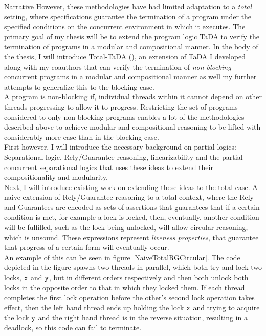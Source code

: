 \documentclass{article}
\begin{document}
\begin{section}{Narrative}
  However, these methodologies have had limited adaptation to a \emph{total} setting, where specifications guarantee the termination of a program under the specified conditions on the concurrent environment in which it executes. The primary goal of my thesis will be to extend the program logic TaDA to verify the termination of programs in a modular and compositional manner. In the body of the thesis, I will introduce Total-TaDA (\cite{Total-TaDA}), an extension of TaDA I developed along with my coauthors that can verify the termination of \emph{non-blocking} concurrent programs in a modular and compositional manner as well my further attempts to generalize this to the blocking case. \\

  A program is non-blocking if, individual threads within it cannot depend on other threads progressing to allow it to progress. Restricting the set of programs considered to only non-blocking programs enables a lot of the methodologies described above to achieve modular and compositional reasoning to be lifted with considerably more ease than in the blocking case. \\

  First however, I will introduce the necessary background on partial logics: Separational logic, Rely/Guarantee reasoning, linearizability and the partial concurrent separational logics that uses these ideas to extend their compositionality and modularity. \\

  Next, I will introduce existing work on extending these ideas to the total case. A naive extension of Rely/Guarantee reasoning to a total context, where the Rely and Guarantees are encoded as sets of assertions that guarantees that if a certain condition is met, for example a lock is locked, then, eventually, another condition will be fulfilled, such as the lock being unlocked, will allow circular reasoning, which is unsound\textsuperscript{\cite{McMillan}}. These expressions represent \emph{liveness properties}, that guarantee that progress of a certain form will eventually occur. \\

  An example of this can be seen in figure \ref{NaiveTotalRGCircular}. The code depicted in the figure spawns two threads in parallel, which both try and lock two locks, $\mathtt{x}$ and $\mathtt{y}$, but in different orders respectively and then both unlock both locks in the opposite order to that in which they locked them. If each thread completes the first lock operation before the other's second lock operation takes effect, then the left hand thread ends up holding the lock $\mathtt{x}$ and trying to acquire the lock $\mathtt{y}$ and the right hand thread is in the reverse situation, resulting in a deadlock, so this code can fail to terminate.\\


\end{section}
\end{document}
